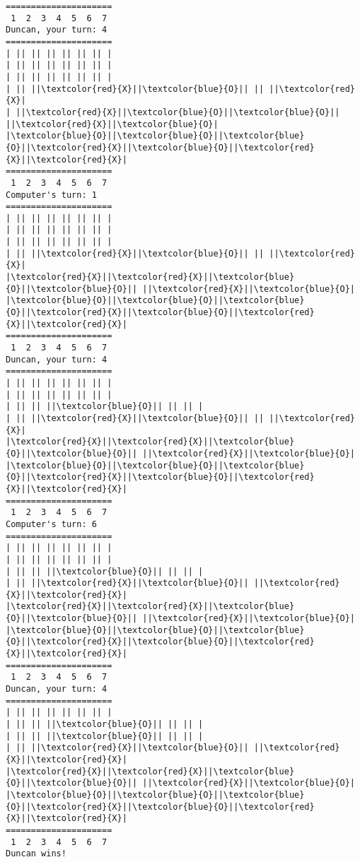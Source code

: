 \documentclass{article}
\begin{document}
\begin{Verbatim}[commandchars=\\\{\}]
=====================
 1  2  3  4  5  6  7
Duncan, your turn: 4
=====================
| || || || || || || |
| || || || || || || |
| || || || || || || |
| || ||\textcolor{red}{X}||\textcolor{blue}{O}|| || ||\textcolor{red}{X}|
| ||\textcolor{red}{X}||\textcolor{blue}{O}||\textcolor{blue}{O}|| ||\textcolor{red}{X}||\textcolor{blue}{O}|
|\textcolor{blue}{O}||\textcolor{blue}{O}||\textcolor{blue}{O}||\textcolor{red}{X}||\textcolor{blue}{O}||\textcolor{red}{X}||\textcolor{red}{X}|
=====================
 1  2  3  4  5  6  7
Computer's turn: 1
=====================
| || || || || || || |
| || || || || || || |
| || || || || || || |
| || ||\textcolor{red}{X}||\textcolor{blue}{O}|| || ||\textcolor{red}{X}|
|\textcolor{red}{X}||\textcolor{red}{X}||\textcolor{blue}{O}||\textcolor{blue}{O}|| ||\textcolor{red}{X}||\textcolor{blue}{O}|
|\textcolor{blue}{O}||\textcolor{blue}{O}||\textcolor{blue}{O}||\textcolor{red}{X}||\textcolor{blue}{O}||\textcolor{red}{X}||\textcolor{red}{X}|
=====================
 1  2  3  4  5  6  7
Duncan, your turn: 4
=====================
| || || || || || || |
| || || || || || || |
| || || ||\textcolor{blue}{O}|| || || |
| || ||\textcolor{red}{X}||\textcolor{blue}{O}|| || ||\textcolor{red}{X}|
|\textcolor{red}{X}||\textcolor{red}{X}||\textcolor{blue}{O}||\textcolor{blue}{O}|| ||\textcolor{red}{X}||\textcolor{blue}{O}|
|\textcolor{blue}{O}||\textcolor{blue}{O}||\textcolor{blue}{O}||\textcolor{red}{X}||\textcolor{blue}{O}||\textcolor{red}{X}||\textcolor{red}{X}|
=====================
 1  2  3  4  5  6  7
Computer's turn: 6
=====================
| || || || || || || |
| || || || || || || |
| || || ||\textcolor{blue}{O}|| || || |
| || ||\textcolor{red}{X}||\textcolor{blue}{O}|| ||\textcolor{red}{X}||\textcolor{red}{X}|
|\textcolor{red}{X}||\textcolor{red}{X}||\textcolor{blue}{O}||\textcolor{blue}{O}|| ||\textcolor{red}{X}||\textcolor{blue}{O}|
|\textcolor{blue}{O}||\textcolor{blue}{O}||\textcolor{blue}{O}||\textcolor{red}{X}||\textcolor{blue}{O}||\textcolor{red}{X}||\textcolor{red}{X}|
=====================
 1  2  3  4  5  6  7
Duncan, your turn: 4
=====================
| || || || || || || |
| || || ||\textcolor{blue}{O}|| || || |
| || || ||\textcolor{blue}{O}|| || || |
| || ||\textcolor{red}{X}||\textcolor{blue}{O}|| ||\textcolor{red}{X}||\textcolor{red}{X}|
|\textcolor{red}{X}||\textcolor{red}{X}||\textcolor{blue}{O}||\textcolor{blue}{O}|| ||\textcolor{red}{X}||\textcolor{blue}{O}|
|\textcolor{blue}{O}||\textcolor{blue}{O}||\textcolor{blue}{O}||\textcolor{red}{X}||\textcolor{blue}{O}||\textcolor{red}{X}||\textcolor{red}{X}|
=====================
 1  2  3  4  5  6  7
Duncan wins!
\end{Verbatim}
\end{document}
